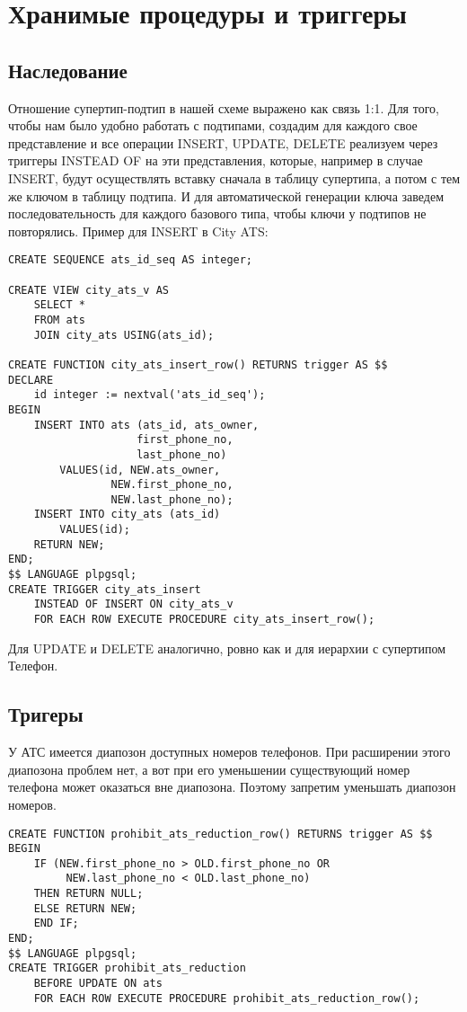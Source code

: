 \documentclass{report}
\begin{document}
\chapter{Хранимые процедуры и триггеры}

\section{Наследование}

Отношение супертип-подтип в нашей схеме выражено как связь 1:1. 
Для того, чтобы нам было удобно работать с подтипами, создадим
для каждого свое представление и все операции INSERT, UPDATE, DELETE
реализуем через триггеры INSTEAD OF на эти представления, которые,
например в случае INSERT, будут осуществлять вставку сначала в 
таблицу супертипа, а потом с тем же ключом в таблицу подтипа.
И для автоматической генерации ключа заведем последовательность 
для каждого базового типа, чтобы ключи у подтипов не повторялись.
Пример для INSERT в City ATS:
\begin{lstlisting}
CREATE SEQUENCE ats_id_seq AS integer;

CREATE VIEW city_ats_v AS
    SELECT *
    FROM ats 
    JOIN city_ats USING(ats_id); 

CREATE FUNCTION city_ats_insert_row() RETURNS trigger AS $$
DECLARE
    id integer := nextval('ats_id_seq');
BEGIN
    INSERT INTO ats (ats_id, ats_owner, 
                    first_phone_no, 
                    last_phone_no)
        VALUES(id, NEW.ats_owner, 
                NEW.first_phone_no, 
                NEW.last_phone_no);
    INSERT INTO city_ats (ats_id)
        VALUES(id);
    RETURN NEW;
END;
$$ LANGUAGE plpgsql;
CREATE TRIGGER city_ats_insert 
    INSTEAD OF INSERT ON city_ats_v
    FOR EACH ROW EXECUTE PROCEDURE city_ats_insert_row();
\end{lstlisting}

Для UPDATE и DELETE аналогично, ровно как и для иерархии с супертипом
Телефон.

\section{Тригеры}

У АТС имеется диапозон доступных номеров телефонов. При расширении этого 
диапозона проблем нет, а вот при его уменьшении существующий номер 
телефона может оказаться вне диапозона. Поэтому запретим уменьшать 
диапозон номеров.

\begin{lstlisting}
CREATE FUNCTION prohibit_ats_reduction_row() RETURNS trigger AS $$
BEGIN
    IF (NEW.first_phone_no > OLD.first_phone_no OR
         NEW.last_phone_no < OLD.last_phone_no)
    THEN RETURN NULL;
    ELSE RETURN NEW;
    END IF;
END;
$$ LANGUAGE plpgsql;
CREATE TRIGGER prohibit_ats_reduction 
    BEFORE UPDATE ON ats
    FOR EACH ROW EXECUTE PROCEDURE prohibit_ats_reduction_row();
\end{lstlisting}
\end{document}
